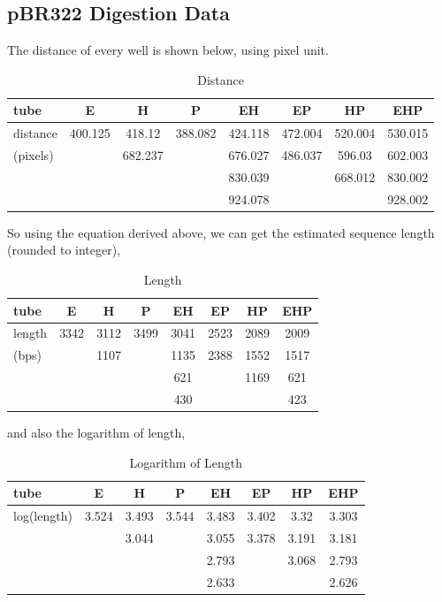 \documentclass{article}
\begin{document}
        \subsection{pBR322 Digestion Data}
            The distance of every well is shown below, using pixel unit.
            \begin{table}[H]
                \caption{Distance}
                \centering
                \begin{tabular}{|l|c|c|c|c|c|c|c|}
                    \hline
                    tube&E&H&P&EH&EP&HP&EHP\\
                    \hline
                    distance&400.125&418.12&388.082&424.118&472.004&520.004&530.015\\
                    (pixels)&&682.237&&676.027&486.037&596.03&602.003\\
                    &&&&830.039&&668.012&830.002\\
                    &&&&924.078&&&928.002\\
                    \hline
                \end{tabular}
                \label{data.table}
            \end{table}
            So using the equation derived above, we can get the estimated sequence length (rounded to integer),
            \begin{table}[H]
                \caption{Length}
                \centering
                \begin{tabular}{|l|c|c|c|c|c|c|c|}
                    \hline
                    tube&E&H&P&EH&EP&HP&EHP\\
                    \hline
                    length&3342&3112&3499&3041&2523&2089&2009\\
                    (bps)&&1107&&1135&2388&1552&1517\\
                    &&&&621&&1169&621\\
                    &&&&430&&&423\\
                    \hline
                \end{tabular}
                \label{data.len.table}
            \end{table}
            and also the logarithm of length,
            \begin{table}[H]
                \caption{Logarithm of Length}
                \centering
                \begin{tabular}{|l|c|c|c|c|c|c|c|}
                    \hline
                    tube&E&H&P&EH&EP&HP&EHP\\
                    \hline
                    log(length)&3.524&3.493&3.544&3.483&3.402&3.32&3.303\\
                    &&3.044&&3.055&3.378&3.191&3.181\\
                    &&&&2.793&&3.068&2.793\\
                    &&&&2.633&&&2.626\\
                    \hline
                \end{tabular}
                \label{data.log.table}
            \end{table}
\end{document}
